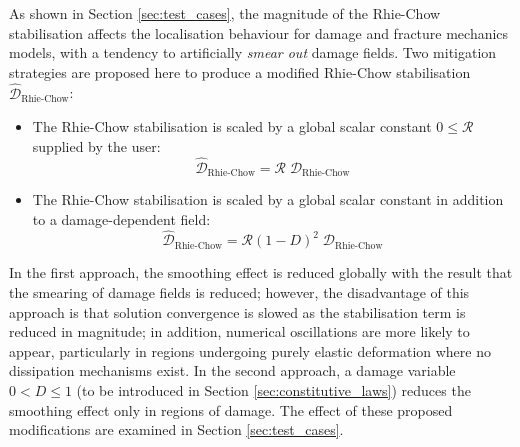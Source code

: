\documentclass[sn-mathphys,Numbered,draft]{sn-jnl}%
\begin{document}
As shown in Section \ref{sec:test_cases}, the magnitude of the Rhie-Chow stabilisation affects the localisation behaviour for damage and fracture mechanics models, with a tendency to artificially \emph{smear out} damage fields.
Two mitigation strategies are proposed here to produce a modified Rhie-Chow stabilisation $\hat{\mathcal{D}}_{\text {Rhie-Chow}}$:
\begin{itemize}
	\item The Rhie-Chow stabilisation is scaled by a global scalar constant $0 \leq \mathcal{R}$ supplied by the user:
	\begin{equation}
		\hat{\mathcal{D}}_{\text{Rhie-Chow}} = \mathcal{R} \; \mathcal{D}_{\text {Rhie-Chow}}
	\end{equation}
	\item The Rhie-Chow stabilisation is scaled by a global scalar constant in addition to a damage-dependent field:
	\begin{equation}
		\hat{\mathcal{D}}_{\text{Rhie-Chow}} = \mathcal{R} (1-D)^2 \; \mathcal{D}_{\text {Rhie-Chow}}
	\end{equation}
\end{itemize}
In the first approach, the smoothing effect is reduced globally with the result that the smearing of damage fields is reduced; however, the disadvantage of this approach is that solution convergence is slowed as the stabilisation term is reduced in magnitude; in addition, numerical oscillations are more likely to appear, particularly in regions undergoing purely elastic deformation where no dissipation mechanisms exist.
In the second approach, a damage variable $0 < D \leq 1$ (to be introduced in Section \ref{sec:constitutive_laws}) reduces the smoothing effect only in regions of damage.
The effect of these proposed modifications are examined in Section \ref{sec:test_cases}.


\end{document}
